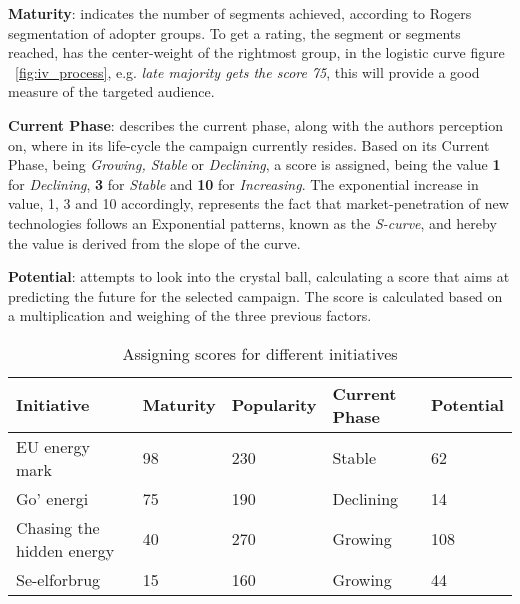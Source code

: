 \documentclass[journal]{IEEEtran}
\begin{document}
\textbf{Maturity}: indicates the number of segments achieved, according to Rogers segmentation of adopter groups. 
To get a rating, the segment or segments reached, has the center-weight of the rightmost group, in the logistic curve figure ~\ref{fig:iv_process}, e.g. \textit{late majority gets the score 75}, this will provide a good measure of the targeted audience.\newline

\textbf{Current Phase}: describes the current phase, along with the authors perception on, where in its life-cycle the campaign currently resides. Based on its Current Phase, being \textit{Growing, Stable} or \textit{Declining}, a score is assigned, being the value \textbf{1} for \textit{Declining}, \textbf{3} for \textit{Stable} and \textbf{10} for \textit{Increasing}. The exponential increase in value, 1, 3 and 10 accordingly, represents the fact that market-penetration of new technologies follows an Exponential patterns, known as the \textit{S-curve}\cite{rogers_model}, and hereby the value is derived from the slope of the curve.  \newline

\textbf{Potential}: attempts to look into the crystal ball, calculating a score that aims at predicting the future for the selected campaign. The score is calculated based on a multiplication and weighing of the three previous factors. \newline 


\begin{table}[t2]

\caption{Assigning scores for different initiatives} %
\centering  %

\begin{tabular}{|p{2.5cm} |p{0.9cm} |p{0.9cm} |p{}| p{} |} %
\hline\hline                        %

Initiative & Maturity & Popularity & Current Phase & Potential\\ [0.5ex] %
\hline                  %

EU energy mark & 
98  & 
230 &
Stable &
62 \\
\hline

Go' energi & 
75 & 
190 &
Declining &
14 \\
\hline

Chasing the hidden energy & 
40 & 
270 &
Growing &
108 \\
\hline

Se-elforbrug & 
15  & 
160 &
Growing &
44 \\
\hline
\end{tabular}
\label{table:score} %
\end{table}
\end{document}
